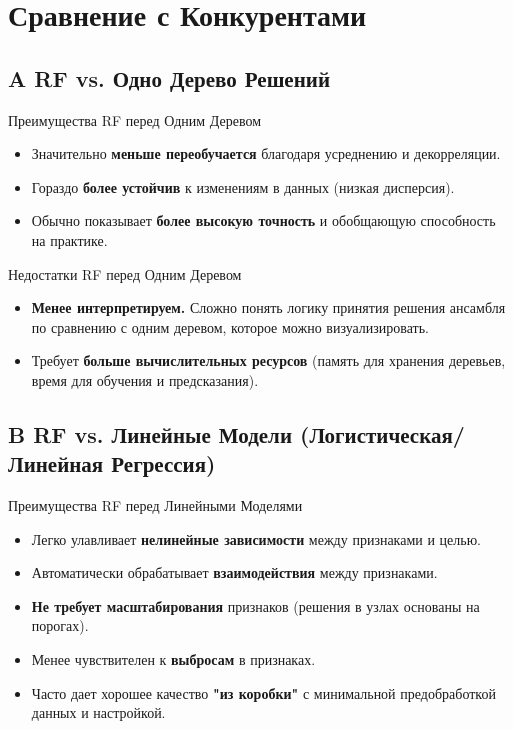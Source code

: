 \section{Сравнение с Конкурентами}

\subsection{A RF vs. Одно Дерево Решений}

\begin{myblock}{Преимущества RF перед Одним Деревом}
    \begin{itemize}[nosep, leftmargin=*]
        \item Значительно \textbf{меньше переобучается} благодаря усреднению и декорреляции.
        \item Гораздо \textbf{более устойчив} к изменениям в данных (низкая дисперсия).
        \item Обычно показывает \textbf{более высокую точность} и обобщающую способность на практике.
    \end{itemize}
\end{myblock}

\begin{myblock}{Недостатки RF перед Одним Деревом}
    \begin{itemize}[nosep, leftmargin=*]
        \item \textbf{Менее интерпретируем.} Сложно понять логику принятия решения ансамбля по сравнению с одним деревом, которое можно визуализировать.
        \item Требует \textbf{больше вычислительных ресурсов} (память для хранения деревьев, время для обучения и предсказания).
    \end{itemize}
\end{myblock}

\subsection{B RF vs. Линейные Модели (Логистическая/Линейная Регрессия)}

\begin{myblock}{Преимущества RF перед Линейными Моделями}
    \begin{itemize}[nosep, leftmargin=*]
        \item Легко улавливает \textbf{нелинейные зависимости} между признаками и целью.
        \item Автоматически обрабатывает \textbf{взаимодействия} между признаками.
        \item \textbf{Не требует масштабирования} признаков (решения в узлах основаны на порогах).
        \item Менее чувствителен к \textbf{выбросам} в признаках.
        \item Часто дает хорошее качество \textbf{"из коробки"} с минимальной предобработкой данных и настройкой.
    \end{itemize}
\end{myblock}


